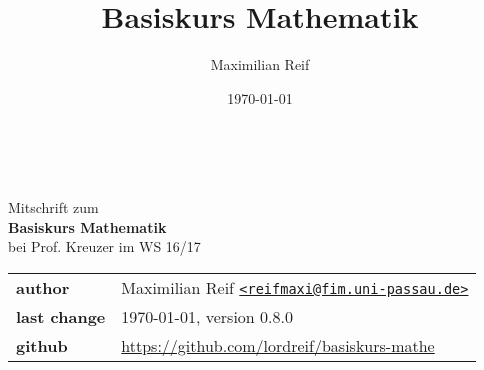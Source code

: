 \documentclass[11pt,a4paper,ngerman]{article}
\date{\today}
\author{Maximilian Reif}
\title{Basiskurs Mathematik}
\begin{document}
\begin{titlepage}
    \ \newline\newline\newline\newline\newline
	\begin{center}
		\huge Mitschrift zum \\
		\Huge \textbf{Basiskurs Mathematik} \\
		\huge bei Prof. Kreuzer im WS 16/17 \\
		\normalsize

		\vspace{1cm}
		\begin{tabular}[b]{l|l}
			\textbf{author} & Maximilian Reif \texttt{\href{mailto:reifmaxi@fim.uni-passau.de}
			{<reifmaxi@fim.uni-passau.de>}} \\
			\textbf{last change} & \today, version 0.8.0 \\
			\textbf{github} & \url{https://github.com/lordreif/basiskurs-mathe}
		\end{tabular}

		\vspace{1cm}
		
	\end{center}
   
	
\end{titlepage}

\setcounter{page}{2}

\newpage
\tableofcontents \thispagestyle{empty}
\newpage







%
%
%
%
\setcounter{section}{10}


\end{document}
